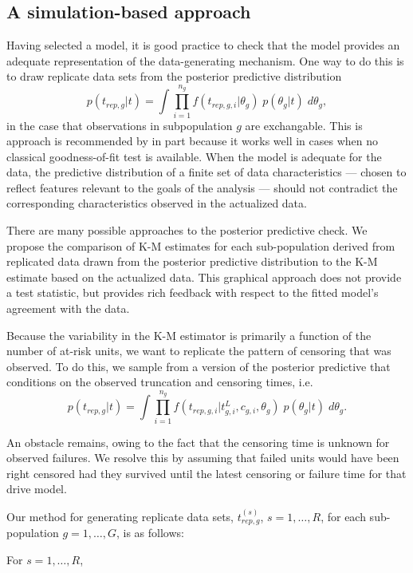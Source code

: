\documentclass[11pt]{article}
\begin{document}
\subsection{A simulation-based approach}
\label{model-assessment}
Having selected a model, it is good practice to check that the model provides an adequate representation of the data-generating mechanism. One way to do this is to draw replicate data sets from the posterior predictive distribution
$$p(t_{rep,g}|t) = \int \prod_{i=1}^{n_g} f(t_{rep,g,i}|\theta_g)\; p(\theta_g|t)\;d\theta_g,$$
in the case that observations in subpopulation $g$ are exchangable.  This is approach is recommended by \cite{gelman1996postpred} in part because it works well in cases when no classical goodness-of-fit test is available. When the model is adequate for the data, the predictive distribution of a finite set of data characteristics --- chosen to reflect features relevant to the goals of the analysis --- should not contradict the corresponding characteristics observed in the actualized data.

There are many possible approaches to the posterior predictive check. We propose the comparison of K-M estimates for each sub-population derived from replicated data drawn from the posterior predictive distribution to the K-M estimate based on the actualized data. This graphical approach does not provide a test statistic, but provides rich feedback with respect to the fitted model's agreement with the data.

Because the variability in the K-M estimator is primarily a function of the number of at-risk units, we want to replicate the pattern of censoring that was observed. To do this, we sample from a version of the posterior predictive that conditions on the observed truncation and censoring times, i.e. 
$$p(t_{rep,g}|t) = \int \prod_{i=1}^{n_g}f(t_{rep,g,i}|t_{g,i}^L,c_{g,i},\theta_g)\;p(\theta_g|t)\;d\theta_g.$$

An obstacle remains, owing to the fact that the censoring time is unknown for observed failures. We resolve this by assuming that failed units would have been right censored had they survived until the latest censoring or failure time for that drive model.

Our method for generating replicate data sets, $t_{rep,g}^{(s)}$, $s = 1,\ldots, R$, for each sub-population $g=1,\ldots,G$, is as follows:

For $s=1,\ldots, R$,
\end{document}
